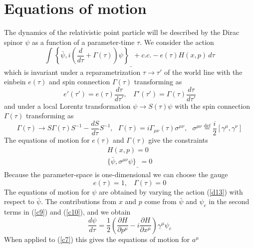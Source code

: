 \documentclass[a4paper,a4paper]{article}
\begin{document}
\section{Equations of motion}
The dynamics of the relativistic point particle will be described by the Dirac
spinor $\psi $ as a function of a parameter-time $\tau $. We consider the action
\begin{equation} 
\int_{}^{}{\left\{ \bar{\psi },i\left( \frac{d}{d\tau}+\Gamma(\tau )\right)\psi 
\right\}_{_{\sim}}+c.c.-e(\tau )H(x,p)\,d\tau }
\label{d1}
\end{equation}
which is invariant under a reparametrization $\tau \to \tau'$ of the world line
with the einbein $e(\tau)$ and spin connection $\Gamma(\tau )$ transforming as
\begin{equation}
e'(\tau' )= e(\tau )\frac{d\tau }{d\tau' }, \ \ \ \ \Gamma '(\tau ')=\Gamma
(\tau )\frac{d\tau }{d\tau' }
\label{d12}
\end{equation}
and under a local Lorentz transformation $\psi \to  S(\tau )\psi$ with the spin
connection $\Gamma (\tau )$ transforming as
\begin{equation}
\Gamma (\tau )\to S\Gamma (\tau )S^{-1}-\frac{dS}{d\tau }S^{-1}, \ \ \ \Gamma
(\tau )=i\Gamma _{\mu \nu }(\tau )\sigma ^{\mu \nu }, \ \ \ \sigma ^{\mu \nu
}\stackrel{ \mathrm{def}}{=} \frac{i}{2}[\gamma^{\mu }, \gamma^{\nu }] 
\label{d13}
\end{equation}
The equations of motion for $e(\tau )$ and $\Gamma (\tau )$ give the constraints
\begin{eqnarray}
H(x,p)=0 
\label{d14} \\
\{\bar{\psi },\sigma ^{\mu \nu }\psi\}_{_{\sim }} = 0 
\label{d15}
\end{eqnarray}
Because the parameter-space is one-dimensional we can choose the gauge
\begin{equation}
e(\tau )=1, \ \ \ \ \Gamma (\tau )=0
\label{d16}
\end{equation}
The equations of motion for $\psi $ are obtained by varying the action
(\ref{d13}) with respect to $\bar{\psi }$. The contributions from $x$ and $p$
come from $\bar{\psi }$ and $\psi _{c}$ in the second terms in (\ref{c9}) and
(\ref{c10}), and we obtain     
\begin{equation} 
\frac{d\psi}{d\tau} = \frac{1}{2}\left(\frac{\partial H}{\partial p^{\mu }} - i
\frac{\partial H}{\partial x^{\mu }}\right) \gamma ^{\mu }\psi _{c}
\label{d2}
\end{equation}
When applied to (\ref{c7}) this gives the equations of motion for $a^{\mu }$ 
\end{document}
